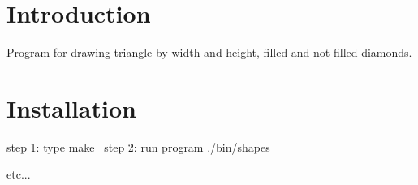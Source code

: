 \hypertarget{index_Introduction}{}\section{Introduction}\label{index_Introduction}
Program for drawing triangle by width and height, filled and not filled diamonds.\hypertarget{index_Installation}{}\section{Installation}\label{index_Installation}
step 1\+: type make~\newline
step 2\+: run program ./bin/shapes

etc... 